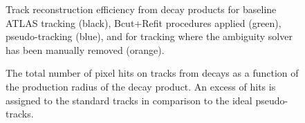 %
\begin{figure}[!htbp]
    \centering
    \vspace{0.05em}
    \caption{Track reconstruction efficiency from \bhadron decay products for baseline ATLAS tracking (black), Bcut+Refit procedures applied (green), pseudo-tracking (blue), and for tracking where the ambiguity solver has been manually removed (orange).}
    \label{fig:reconstruction efficiency from B}
\end{figure}

\begin{figure}[!htbp]
    \centering
    \vspace{0.05em}
    \caption{The total number of pixel hits on tracks from \bhadron decays as a function of the production radius of the decay product. An excess of hits is assigned to the standard tracks in comparison to the ideal pseudo-tracks.}
    \label{fig:total hits on pix from b}
    \label{fig:misc}
\end{figure}
%

